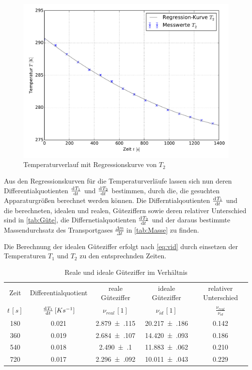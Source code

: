 \begin{figure}
	\centering
	\includegraphics[scale=0.75]{Plots/Temperaturverlauf_T2.pdf}
	\caption{Temperaturverlauf mit Regressionskurve von $T_{2}$}
	\label{fig:T2}
\end{figure}

Aus den Regressionskurven für die Temperaturverläufe lassen sich nun deren Differentialquotienten $\od{T_{1}}{t}$ und $\tod{T_{2}}{t}$
bestimmen, durch die, die gesuchten Apparaturgrößen berechnet werden können. Die Differntialqoutienten $\od{T_{1}}{t}$ und die 
berechneten, idealen und realen, Güteziffern sowie deren relativer Unterschied sind in \autoref{tab:Güte}, die 
Differnetialquotienten $\od{T_{2}}{t}$ und der daraus bestimmte Massendurchsatz des Transportgases $\tfrac{\Delta m}{\Delta t}$
in \autoref{tab:Masse} zu finden.

Die Berechnung der idealen Güteziffer erfolgt nach \eqref{eq:vid} durch einsetzen der Temperaturen $T_{1}$ und $T_{2}$ zu den entsprechnden
Zeiten. 	

\begin{table}
	\centering
	\begin{tabular}{|c|c|c|c|c|}
		\hline
		    Zeit      &    Differentialquotient    & reale Güteziffer  & ideale Güteziffer &     relativer Unterschied     \\
		$t\,[\si{s}]$ & $\od{T_{1}}{t}\,[Ks^{-1}]$ & $\nu_{real}\,[1]$ &  $\nu_{id}\,[1]$  & $\frac{\nu_{real}}{\nu_{id}}$ \\ \hline\hline
		     180      &        \num{0.021}         & \num{2.879(115)}  & \num{20.217(186)} &          \num{0.142}          \\
		     360      &        \num{0.019}         & \num{2.684(107)}  & \num{14.420(093)} &          \num{0.186}          \\
		     540      &        \num{0.018}         & \num{2.490(100)}  & \num{11.883(062)} &          \num{0.210}          \\
		     720      &        \num{0.017}         & \num{2.296(092)}  & \num{10.011(043)} &          \num{0.229}          \\ \hline
	\end{tabular}
	\caption{Reale und ideale Güteziffer im Verhältnis}
	\label{tab:Güte}
\end{table}

